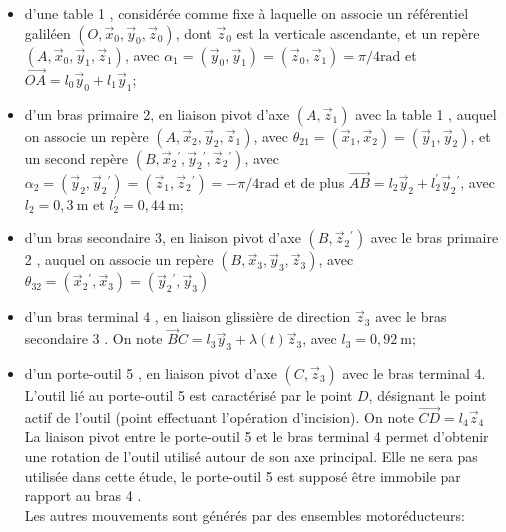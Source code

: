 \begin{itemize}
  \item d'une table 1 , considérée comme fixe à laquelle on associe un référentiel galiléen $\left(O, \vec{x}_{0}, \vec{y}_{0}, \vec{z}_{0}\right)$, dont $\vec{z}_{0}$ est la verticale ascendante, et un repère $\left(A, \vec{x}_{0}, \vec{y}_{1}, \vec{z}_{1}\right)$, avec $\alpha_{1}=\left(\vec{y}_{0}, \vec{y}_{1}\right)=\left(\vec{z}_{0}, \vec{z}_{1}\right)=\pi / 4 \mathrm{rad}$ et $\overrightarrow{O A}=l_{0} \vec{y}_{0}+l_{1} \vec{y}_{1}$;
  \item d'un bras primaire 2, en liaison pivot d'axe $\left(A, \vec{z}_{1}\right)$ avec la table 1 , auquel on associe un repère $\left(A, \vec{x}_{2}, \vec{y}_{2}, \vec{z}_{1}\right)$, avec $\theta_{21}=\left(\vec{x}_{1}, \vec{x}_{2}\right)=\left(\vec{y}_{1}, \vec{y}_{2}\right)$, et un second repère $\left(B, \vec{x}_{2}{ }^{\prime}, \vec{y}_{2}{ }^{\prime}, \vec{z}_{2}{ }^{\prime}\right)$, avec $\alpha_{2}=\left(\vec{y}_{2}, \vec{y}_{2}{ }^{\prime}\right)=\left(\vec{z}_{1}, \vec{z}_{2}{ }^{\prime}\right)=-\pi / 4 \mathrm{rad}$ et de plus $\overrightarrow{A B}=l_{2} \vec{y}_{2}+l_{2}^{\prime} \vec{y}_{2}{ }^{\prime}$, avec $l_{2}=0,3 \mathrm{~m}$ et $l_{2}^{\prime}=0,44 \mathrm{~m}$;
  \item d'un bras secondaire 3, en liaison pivot d'axe $\left(B, \vec{z}_{2}{ }^{\prime}\right)$ avec le bras primaire 2 , auquel on associe un repère $\left(B, \vec{x}_{3}, \vec{y}_{3}, \vec{z}_{3}\right)$, avec $\theta_{32}=\left(\vec{x}_{2}{ }^{\prime}, \vec{x}_{3}\right)=\left(\vec{y}_{2}{ }^{\prime}, \vec{y}_{3}\right)$
  \item d'un bras terminal 4 , en liaison glissière de direction $\vec{z}_{3}$ avec le bras secondaire 3 . On note $\vec{B} C=l_{3} \vec{y}_{3}+\lambda(t) \vec{z}_{3}$, avec $l_{3}=0,92 \mathrm{~m} ;$
  \item d'un porte-outil 5 , en liaison pivot d'axe $\left(C, \vec{z}_{3}\right)$ avec le bras terminal 4. L'outil lié au porte-outil 5 est caractérisé par le point $D$, désignant le point actif de l'outil (point effectuant l'opération d'incision). On note $\overrightarrow{C D}=l_{4} \vec{z}_{4}$\\
La liaison pivot entre le porte-outil 5 et le bras terminal 4 permet d'obtenir une rotation de l'outil utilisé autour de son axe principal. Elle ne sera pas utilisée dans cette étude, le porte-outil 5 est supposé être immobile par rapport au bras 4 .\\
Les autres mouvements sont générés par des ensembles motoréducteurs:

\end{itemize}
